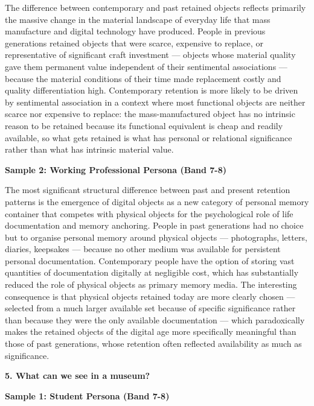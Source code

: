 The difference between contemporary and past retained objects reflects primarily the massive change in the material landscape of everyday life that mass manufacture and digital technology have produced. People in previous generations retained objects that were scarce, expensive to replace, or representative of significant craft investment — objects whose material quality gave them permanent value independent of their sentimental associations — because the material conditions of their time made replacement costly and quality differentiation high. Contemporary retention is more likely to be driven by sentimental association in a context where most functional objects are neither scarce nor expensive to replace: the mass-manufactured object has no intrinsic reason to be retained because its functional equivalent is cheap and readily available, so what gets retained is what has personal or relational significance rather than what has intrinsic material value.

\textbf{Sample 2: Working Professional Persona (Band 7-8)}

The most significant structural difference between past and present retention patterns is the emergence of digital objects as a new category of personal memory container that competes with physical objects for the psychological role of life documentation and memory anchoring. People in past generations had no choice but to organise personal memory around physical objects — photographs, letters, diaries, keepsakes — because no other medium was available for persistent personal documentation. Contemporary people have the option of storing vast quantities of documentation digitally at negligible cost, which has substantially reduced the role of physical objects as primary memory media. The interesting consequence is that physical objects retained today are more clearly chosen — selected from a much larger available set because of specific significance rather than because they were the only available documentation — which paradoxically makes the retained objects of the digital age more specifically meaningful than those of past generations, whose retention often reflected availability as much as significance.

\separator

\begin{ieltsquestion}
\textbf{5. What can we see in a museum?}
\end{ieltsquestion}
\textbf{Sample 1: Student Persona (Band 7-8)}

